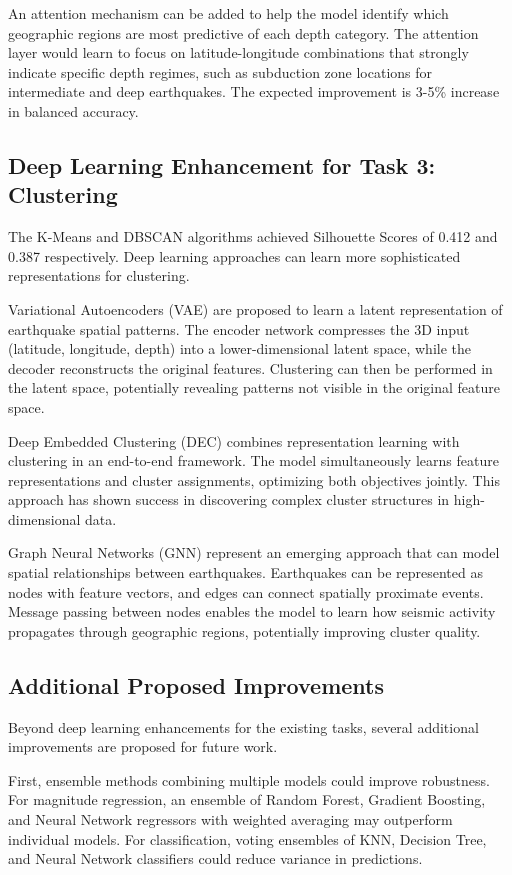 An attention mechanism can be added to help the model identify which geographic regions are most predictive of each depth category. The attention layer would learn to focus on latitude-longitude combinations that strongly indicate specific depth regimes, such as subduction zone locations for intermediate and deep earthquakes. The expected improvement is 3-5\% increase in balanced accuracy.

\subsection{Deep Learning Enhancement for Task 3: Clustering}

The K-Means and DBSCAN algorithms achieved Silhouette Scores of 0.412 and 0.387 respectively. Deep learning approaches can learn more sophisticated representations for clustering.

Variational Autoencoders (VAE) are proposed to learn a latent representation of earthquake spatial patterns. The encoder network compresses the 3D input (latitude, longitude, depth) into a lower-dimensional latent space, while the decoder reconstructs the original features. Clustering can then be performed in the latent space, potentially revealing patterns not visible in the original feature space.

Deep Embedded Clustering (DEC) combines representation learning with clustering in an end-to-end framework. The model simultaneously learns feature representations and cluster assignments, optimizing both objectives jointly. This approach has shown success in discovering complex cluster structures in high-dimensional data.

Graph Neural Networks (GNN) represent an emerging approach that can model spatial relationships between earthquakes. Earthquakes can be represented as nodes with feature vectors, and edges can connect spatially proximate events. Message passing between nodes enables the model to learn how seismic activity propagates through geographic regions, potentially improving cluster quality.

\subsection{Additional Proposed Improvements}

Beyond deep learning enhancements for the existing tasks, several additional improvements are proposed for future work.

First, ensemble methods combining multiple models could improve robustness. For magnitude regression, an ensemble of Random Forest, Gradient Boosting, and Neural Network regressors with weighted averaging may outperform individual models. For classification, voting ensembles of KNN, Decision Tree, and Neural Network classifiers could reduce variance in predictions.

